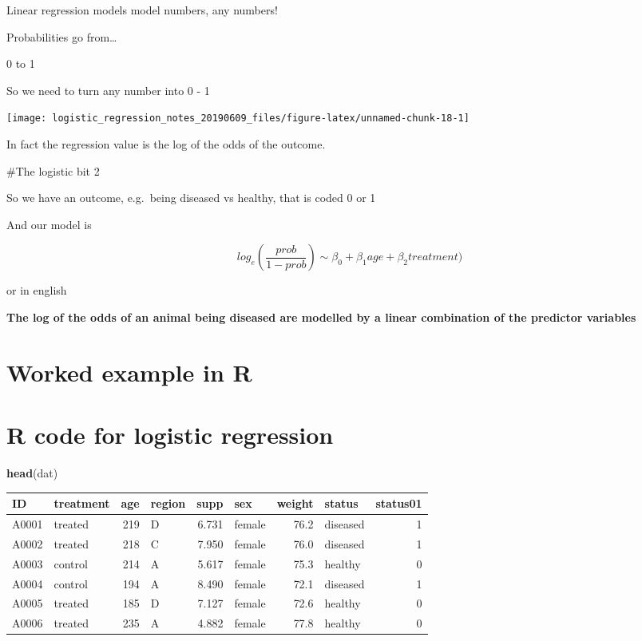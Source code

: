 \documentclass[]{tufte-handout}
\newenvironment{Shaded}{}{}
\newcommand{\KeywordTok}[1]{\textcolor[rgb]{0.00,0.44,0.13}{\textbf{#1}}}
\newcommand{\NormalTok}[1]{#1}
\begin{document}
Linear regression models model numbers, any numbers!

Probabilities go from\ldots{}

0 to 1

So we need to turn any number into 0 - 1

\begin{center}\texttt{[image: logistic\_regression\_notes\_20190609\_files/figure-latex/unnamed-chunk-18-1]} \end{center}

In fact the regression value is the log of the odds of the outcome.

\#The logistic bit 2

So we have an outcome, e.g.~being diseased vs healthy, that is coded 0
or 1

And our model is

\[ log_e(\frac{prob}{1 - prob}) \sim \beta_0 + \beta_1 age + \beta_2 treatment) \]

or in english

\textbf{The log of the odds of an animal being diseased are modelled by
a linear combination of the predictor variables}

\hypertarget{worked-example-in-r}{%
\section{Worked example in R}\label{worked-example-in-r}}

\hypertarget{r-code-for-logistic-regression}{%
\section{R code for logistic
regression}\label{r-code-for-logistic-regression}}

\begin{Shaded}
\begin{Highlighting}[]
\KeywordTok{head}\NormalTok{(dat)}
\end{Highlighting}
\end{Shaded}

\begin{table}[H]
\centering\begingroup\fontsize{8}{10}\selectfont

\begin{tabular}{l|l|r|l|r|l|r|l|r}
\hline
ID & treatment & age & region & supp & sex & weight & status & status01\\
\hline
A0001 & treated & 219 & D & 6.731 & female & 76.2 & diseased & 1\\
\hline
A0002 & treated & 218 & C & 7.950 & female & 76.0 & diseased & 1\\
\hline
A0003 & control & 214 & A & 5.617 & female & 75.3 & healthy & 0\\
\hline
A0004 & control & 194 & A & 8.490 & female & 72.1 & diseased & 1\\
\hline
A0005 & treated & 185 & D & 7.127 & female & 72.6 & healthy & 0\\
\hline
A0006 & treated & 235 & A & 4.882 & female & 77.8 & healthy & 0\\
\hline
\end{tabular}
\endgroup{}
\end{table}
\end{document}
